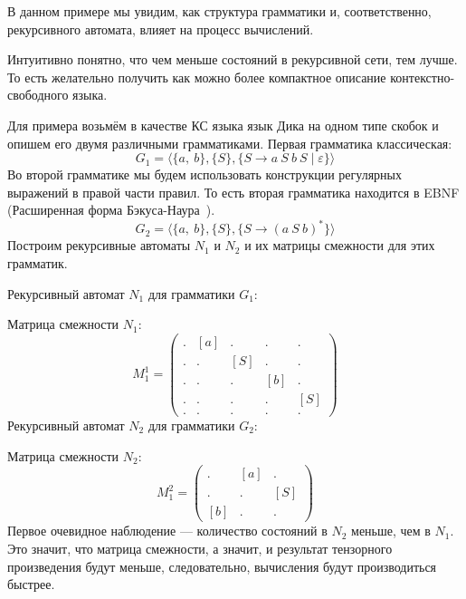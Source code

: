 \begin{example}

В данном примере мы увидим, как структура грамматики и, соответственно, рекурсивного автомата, влияет на процесс вычислений.

Интуитивно понятно, что чем меньше состояний в рекурсивной сети, тем лучше.
То есть желательно получить как можно более компактное описание контекстно-свободного языка.

Для примера возьмём в качестве КС языка язык Дика на одном типе скобок и опишем его двумя различными грамматиками.
Первая грамматика классическая:
\[
G_1 = \langle \{a,\ b\}, \{ S \}, \{S \to a \ S \ b \ S \mid \varepsilon  \} \rangle
\]
Во второй грамматике мы будем использовать конструкции регулярных выражений в правой части правил.
То есть вторая грамматика находится в EBNF (Расширенная форма Бэкуса-Наура~\cite{Hemerik2009, Wirth1977}).
\[
G_2 = \langle \{a, \ b\}, \{S\}, \{S \to (a \ S \ b)^{*}\} \rangle
\]
Построим рекурсивные автоматы $N_1$ и $N_2$ и их матрицы смежности для этих грамматик.

Рекурсивный автомат $N_1$ для грамматики $G_1$:
\begin{center}
\end{center}

Матрица смежности $N_1$:
\[
M_1^1 =
\begin{pmatrix}
. & [a] & .   & .   & .  \\
. & .   & [S] & .   & .  \\
. & .   & .   & [b] & .  \\
. & .   & .   & .   & [S] \\
. & .   & .   & .   & .
\end{pmatrix}
\]
Рекурсивный автомат $N_2$ для грамматики $G_2$:
\begin{center}
  
\end{center}

Матрица смежности $N_2$:
\[
M_1^2 =
\begin{pmatrix}
.   & [a] & .    \\
.   & .   & [S]  \\
[b] & .   & .
\end{pmatrix}
\]
Первое очевидное наблюдение --- количество состояний в $N_2$ меньше, чем в $N_1$.
Это значит, что матрица смежности, а значит, и результат тензорного произведения будут меньше, следовательно, вычисления будут производиться быстрее.


\end{example}
